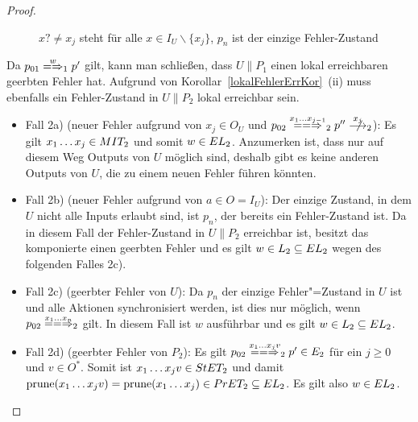 \begin{proof}
\begin{itemize}
\begin{figure} [h!tbp]
\begin{center}
        \caption{$x?\neq x_j$ steht für alle $x\in I_U\backslash\{x_j\}$, $p_n$
          ist der einzige Fehler-Zustand}
      \label{UmitE}
      \end{center}
      \end{figure}
      Da $p_{01}\weakmay[w]_1p'$ gilt, kann man schließen, dass $U\|P_1$ einen
      lokal erreichbaren geerbten Fehler hat. Aufgrund von
      Korollar~\ref{lokalFehlerErrKor}~(ii) muss ebenfalls ein Fehler-Zustand
      in $U\|P_2$ lokal erreichbar sein.
      \begin{itemize}
        \item Fall 2a) (neuer Fehler aufgrund von $x_j\in O_U$ und $p_{02}
          \lweakmay[x_1\dots x_{j-1}]_2p''\nmust[x_j]_2$): Es gilt $x_1\dots
          x_j\in MIT _2$ und somit $w\in EL_2$. Anzumerken ist, dass nur
          auf diesem Weg Outputs von $U$ möglich sind, deshalb gibt es keine
          anderen Outputs von $U$, die zu einem neuen Fehler führen könnten.
        \item Fall 2b) (neuer Fehler aufgrund von $a\in O=I_U$): Der einzige
          Zustand, in dem $U$ nicht alle Inputs erlaubt sind, ist $p_n$, der
          bereits ein Fehler-Zustand ist. Da in diesem Fall der Fehler-Zustand
          in $U\|P_2$ erreichbar ist, besitzt das komponierte \MEIO{} einen
          geerbten Fehler und es gilt $w\in L_2\subseteq EL _2$ wegen des
          folgenden Falles 2c).
        \item Fall 2c) (geerbter Fehler von $U$): Da $p_n$ der einzige
          Fehler"=Zustand in $U$ ist und alle Aktionen synchronisiert werden,
          ist dies nur möglich, wenn $p_{02} \lweakmay[x_1\dots x_n]_2$ gilt.
          In diesem Fall ist $w$ ausführbar und es gilt $w\in L_2\subseteq EL
          _2$.
        \item Fall 2d) (geerbter Fehler von $P_2$): Es gilt $p_{02}
          \lweakmay[x_1\dots x_jv]_2 p'\in E_2$ für ein $j\geq 0$ und $v\in
          O^*$. Somit ist $x_1\dots x_j v\in StET _2$ und damit $\mathrm{prune}
          (x_1\dots x_j v) =\mathrm{prune} (x_1\dots x_j)\in PrET _2\subseteq EL _2$.
          Es gilt also $w\in EL _2$.
      \end{itemize}
  \end{itemize}
\end{proof}

